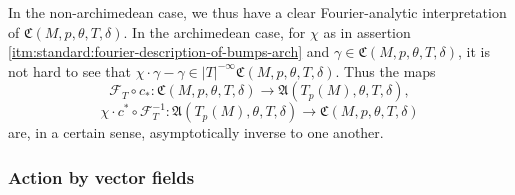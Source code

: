 \documentclass[reqno]{amsart}
\theoremstyle{plain} \newtheorem{theorem} {Theorem}
\theoremstyle{definition} \newtheorem{definition} [theorem] {Definition}
\theoremstyle{itplain} %
\numberwithin{equation}{section}
\numberwithin{theorem}{section}
\begin{document}
\begin{remark}
In the non-archimedean case, we thus have a clear Fourier-analytic interpretation of $\mathfrak{C}(M,p,\theta,T,\delta)$.  In the archimedean case, for $\chi$ as in assertion \eqref{itm:standard:fourier-description-of-bumps-arch} and $\gamma \in \mathfrak{C}(M,p,\theta,T,\delta)$, it is not hard to see that $\chi \cdot \gamma - \gamma \in |T|^{-\infty} \mathfrak{C}(M,p,\theta,T,\delta)$.  Thus the maps
\begin{equation*}
  \mathcal{F}_T \circ c_* : \mathfrak{C}(M,p,\theta,T,\delta) \rightarrow \mathfrak{A}(T_p(M),\theta,T,\delta),
\end{equation*}
\begin{equation*}
  \chi \cdot c^* \circ \mathcal{F}_T^{-1}  : \mathfrak{A}(T_p(M),\theta,T,\delta) \rightarrow \mathfrak{C}(M,p,\theta,T,\delta)
\end{equation*}
are, in a certain sense, asymptotically inverse to one another.
\end{remark}

\subsubsection{Action by vector fields}
\end{document}
